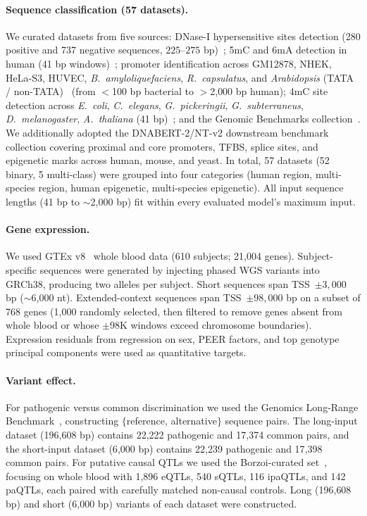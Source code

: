 \documentclass[11pt,a4paper]{article}
\begin{document}
\paragraph{Sequence classification (57 datasets).} We curated datasets from five sources: DNase-I hypersensitive sites detection (280 positive and 737 negative sequences, $225$--$275$ bp)~\citep{feng2024dnase, noble2005dnase}; 5mC and 6mA detection in human (41 bp windows)~\citep{zeng2017methylation}; promoter identification across GM12878, NHEK, HeLa-S3, HUVEC, \emph{B.~amyloliquefaciens}, \emph{R.~capsulatus}, and \emph{Arabidopsis} (TATA / non-TATA)~\citep{oubounyt2019promoters} (from $<$100 bp bacterial to $>$2{,}000 bp human); 4mC site detection across \emph{E.~coli}, \emph{C.~elegans}, \emph{G.~pickeringii}, \emph{G.~subterraneus}, \emph{D.~melanogaster}, \emph{A.~thaliana} (41 bp)~\citep{wei2019methylation}; and the Genomic Benchmarks collection~\citep{manolache2023genomic}. We additionally adopted the DNABERT-2/NT-v2 downstream benchmark collection covering proximal and core promoters, TFBS, splice sites, and epigenetic marks across human, mouse, and yeast. In total, 57 datasets (52 binary, 5 multi-class) were grouped into four categories (human region, multi-species region, human epigenetic, multi-species epigenetic). All input sequence lengths (41 bp to $\sim$2{,}000 bp) fit within every evaluated model's maximum input.
\paragraph{Gene expression.} We used GTEx v8~\citep{gtex2020v8} whole blood data (610 subjects; 21{,}004 genes). Subject-specific sequences were generated by injecting phased WGS variants into GRCh38, producing two alleles per subject. Short sequences span TSS~$\pm 3{,}000$ bp ($\sim$6{,}000 nt). Extended-context sequences span TSS~$\pm 98{,}000$ bp on a subset of 768 genes (1{,}000 randomly selected, then filtered to remove genes absent from whole blood or whose $\pm$98K windows exceed chromosome boundaries). Expression residuals from regression on sex, PEER factors, and top genotype principal components were used as quantitative targets.
\paragraph{Variant effect.} For pathogenic versus common discrimination we used the Genomics Long-Range Benchmark~\citep{trop2024longrange}, constructing $\{$reference, alternative$\}$ sequence pairs. The long-input dataset (196{,}608 bp) contains 22{,}222 pathogenic and 17{,}374 common pairs, and the short-input dataset (6{,}000 bp) contains 22{,}239 pathogenic and 17{,}398 common pairs. For putative causal QTLs we used the Borzoi-curated set~\citep{linder2025borzoi}, focusing on whole blood with 1{,}896 eQTLs, 540 sQTLs, 116 ipaQTLs, and 142 paQTLs, each paired with carefully matched non-causal controls. Long (196{,}608 bp) and short (6{,}000 bp) variants of each dataset were constructed.
\end{document}
